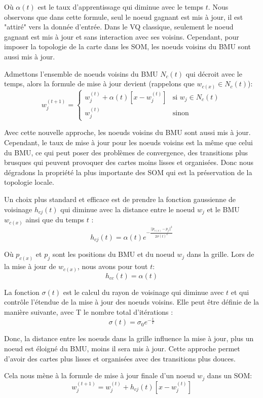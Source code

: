 \documentclass[12pt,a4paper]{report}
\begin{document}
Où $\alpha(t)$ est le taux d'apprentissage qui diminue avec le temps $t$. Nous observons que dans cette formule, seul le noeud gagnant est mis à jour, il est "attiré" vers la donnée d'entrée.
Dans le VQ classique, seulement le noeud gagnant est mis à jour et sans interaction avec ses voisins. Cependant, pour imposer la topologie de la carte dans les SOM, les noeuds voisins du BMU sont aussi mis à jour.

Admettons l'ensemble de noeuds voisins du BMU $N_c(t)$ qui décroit avec le temps, alors la formule de mise à jour devient \cite{SOM1990} (rappelons que $w_{c(x)} \in N_c(t)$):
$$w_j^{(t+1)} = \begin{cases}
    w_j^{(t)} + \alpha(t)[x - w_j^{(t)}] & \text{si } w_j \in N_c(t) \\
    w_j^{(t)} & \text{sinon}
\end{cases}$$

Avec cette nouvelle approche, les noeuds voisins du BMU sont aussi mis à jour. Cependant, le taux de mise à jour pour les noeuds voisins est la même que celui du BMU, 
ce qui peut poser des problèmes de convergence, des transitions plus brusques qui peuvent provoquer des cartes moins lisses et organisées. Donc nous dégradons la propriété
la plus importante des SOM qui est la préservation de la topologie locale.

Un choix plus standard et efficace est de prendre la fonction gaussienne de voisinage $h_{cj}(t)$ qui diminue avec la distance entre le noeud $w_j$ et le BMU $w_{c(x)}$ 
ainsi que du temps $t$ \cite{Kohonen2012SOM}:
$$ h_{cj}(t) = \alpha(t) e^{-\frac{||p_{c(x)} - p_j||^2}{2\sigma(t)^2}} $$

Où $p_{c(x)}$ et $p_j$ sont les positions du BMU et du noeud $w_j$ dans la grille. Lors de la mise à jour de $w_{c(x)}$, nous avons pour tout $t$: 
$$ h_{cc}(t) = \alpha(t)$$

La fonction $\sigma(t)$ est le calcul du rayon de voisinage qui diminue avec $t$ 
et qui contrôle l'étendue de la mise à jour des noeuds voisins. Elle peut être définie de la manière suivante, avec T le nombre total d'itérations \cite{SurveySOM}:
$$\sigma(t) = \sigma_0 e^{-\frac{t}{T}} $$

Donc, la distance entre les noeuds dans la grille influence la mise à jour, plus un noeud est éloigné du BMU, moins il sera mis à jour. Cette approche permet 
d'avoir des cartes plus lisses et organisées avec des transitions plus douces.

Cela nous mène à la formule de mise à jour finale d'un noeud $w_j$ dans un SOM:
$$w_j^{(t+1)} = w_j^{(t)} + h_{cj}(t)[x - w_j^{(t)}]$$
\end{document}
